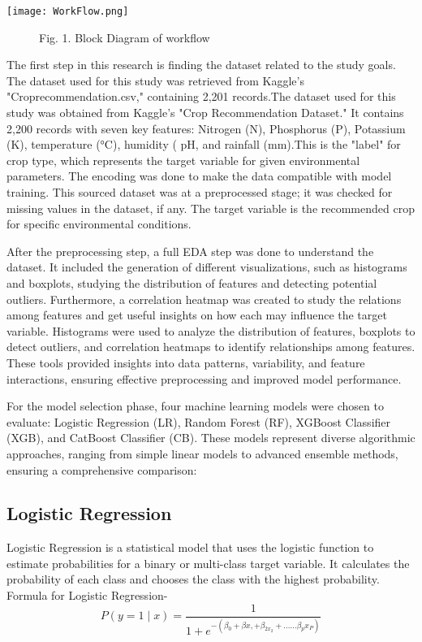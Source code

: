 \documentclass[conference]{IEEEtran}
\begin{document}
\centerline{\texttt{[image: WorkFlow.png]}}

\begin{figure}[h]
\caption{Fig. 1. Block Diagram of workflow}
\end{figure}

The first step in this research is finding the dataset related to the study goals. The dataset used for this study was retrieved from Kaggle's "Croprecommendation.csv," containing 2,201 records.The dataset used for this study was obtained from Kaggle's "Crop Recommendation Dataset." It contains 2,200 records with seven key features: Nitrogen (N), Phosphorus (P), Potassium (K), temperature (°C), hu\-mid\-ity (%
pH, and rainfall (mm).This is the "label" for crop type, which represents the target variable for given environmental parameters. The encoding was done to make the data compatible with model training. This sourced dataset was at a preprocessed stage; it was checked for missing values in the dataset, if any. The target variable is the recommended crop for specific environmental conditions.

After the preprocessing step, a full EDA step was done to understand the dataset. It included the generation of different visualizations, such as histograms and boxplots, studying the distribution of features and detecting potential outliers. Furthermore, a correlation heatmap was created to study the relations among features and get useful insights on how each may influence the target variable. Histograms were used to analyze the distribution of features, boxplots to detect outliers, and correlation heatmaps to identify relationships among features. These tools provided insights into data patterns, variability, and feature interactions, ensuring effective preprocessing and improved model performance.

For the model selection phase, four machine learning models were chosen to evaluate: Logistic Regression (LR), Random Forest (RF), XGBoost Classifier (XGB), and CatBoost Classifier (CB). These models represent diverse algorithmic approaches, ranging from simple linear models to advanced ensemble methods, ensuring a comprehensive comparison:
\subsection{Logistic Regression}\label{AA}
Logistic Regression is a statistical model that uses the logistic function to estimate probabilities for a binary or multi-class target variable. It calculates the probability of each class and chooses the class with the highest probability. Formula for Logistic Regression-
\begin{equation}
    P(y=1 \mid x)=\frac{1}{1+e^{-\left(\beta_0+\beta x,+\beta_{2 x_2}+\ldots \ldots \beta_p x_P\right)}}
\end{equation}
\end{document}
